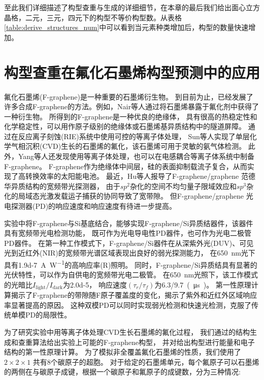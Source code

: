 至此我们详细描述了构型查重与生成的详细细节，在本章的最后我们给出面心立方晶格，二元，三元，四元下的构型不等价构型数。从表格\ref{table:derive_structures_num}中可以看到当元素种类增加后，构型的数量快速增加。

\section{构型查重在氟化石墨烯构型预测中的应用}

氟化石墨烯(F-graphene)是一种重要的石墨烯衍生物\cite{samarakoon2011structural,leenaerts2010first}。
到目前为止，已经发展了许多合成F-graphene的方法。例如，Nair等人通过将石墨烯暴露于氟化剂中获得了一种衍生物。
所得到的F-graphene是一种优良的绝缘体，
具有很高的热稳定性和化学稳定性，可以用作原子级别的绝缘体或石墨烯基异质结构中的隧道屏障\cite{nair2010fluorinated}。
通过在反应离子刻蚀(RIE)系统中使用可控的等离子体处理，
Sun\cite{zhang2016spectroscopic}等人实现了单层化学气相沉积(CVD)生长的石墨烯的氟化，该石墨烯可用于灵敏的氨气体检测。
此外，Yang等人\cite{zhong2016interface}还发现使用等离子体处理，也可以在电感耦合等离子体系统中制备F-graphene。
F-graphene作为绝缘体中间层，硅的表面抑制载流子复合，从而实现了高转换效率的太阳能电池。
最近，Hu等人\cite{du2017broadband}报导了F-graphene/graphene 范德华异质结构的宽频带光探测器，
由于$sp^2$杂化的空间不均匀量子限域效应和$sp^3$杂化的局域态光激发载运子捕获的协同导致了宽带隙。
但F-graphene/graphene 光电探测器(PD)的响应速度和响应速度有待进一步提高。

实验中将F-graphene与Si基底结合，能够实现F-graphene/Si异质结器件，该器件具有宽频带光电检测功能，
既可作为光电导电性PD器件，也可作为光电二极管PD器件。
在第一种工作模式下，F-graphene/Si器件在从深紫外光(DUV)、可见光到近红外(NIR)的宽频带光谱区域表现出良好的弱光探测能力，
在\SI{650}{\nm}光下具有\SI{1.9d-7}{\ampere\per\watt}的高响应率(R)照明。
同时，F-graphene/Si异质结具有显著的光伏特性，可以作为自供电的宽频带光电二极管。
在\SI{650}{\nm}光照下，该工作模式的光暗比$I_{\mathrm{light}}/I_{\mathrm{dark}}$为\num{2.0d-5}，
响应速度$(\tau_r/ \tau_f)$为\SI{6.3/9.7}{(\us)}。
第一性原理计算揭示了F-graphene的带隙随F原子覆盖度的变化，揭示了紫外和近红外区域响应率显著提高的原因。
这种双模PD可以同时实现弱光检测和快速光检测，克服了传统单模PD的局限性。

为了研究实验中用等离子体处理CVD生长石墨烯的氟化过程，
我们通过的结构生成和查重算法给出实验上可能的F-graphene构型，
并对给出构型进行能量和电子结构的第一性原理计算。
为了模拟非全覆盖氟化石墨烯的性质，我们使用了 $2\times 2\times 1$ 共有8个碳原子的超胞。
对于给定的石墨烯单元，每个氟原子可以石墨烯的两侧在与碳原子成键，根据一个碳原子和氟原子的成键数，分为三种情况:

